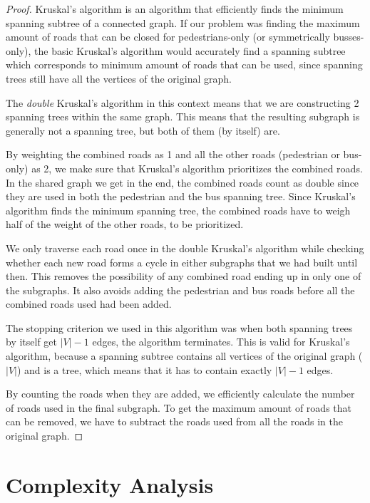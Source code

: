 \documentclass[a4paper]{article}
\begin{document}
\begin{proof}
    Kruskal's algorithm is an algorithm that efficiently finds the minimum spanning subtree of a connected graph. If our problem was finding the maximum amount of roads that can be closed for pedestrians-only (or symmetrically busses-only), the basic Kruskal's algorithm would accurately find a spanning subtree which corresponds to minimum amount of roads that can be used, since spanning trees still have all the vertices of the original graph.

    The \textsl{double} Kruskal's algorithm in this context means that we are constructing 2 spanning trees within the same graph. This means that the resulting subgraph is generally not a spanning tree, but both of them (by itself) are.

    By weighting the combined roads as 1 and all the other roads (pedestrian or bus-only) as 2, we make sure that Kruskal's algorithm prioritizes the combined roads. In the shared graph we get in the end, the combined roads count as double since they are used in both the pedestrian and the bus spanning tree. Since Kruskal's algorithm finds the minimum spanning tree, the combined roads have to weigh half of the weight of the other roads, to be prioritized.

    We only traverse each road once in the double Kruskal's algorithm while checking whether each new road forms a cycle in either subgraphs that we had built until then. This removes the possibility of any combined road ending up in only one of the subgraphs. It also avoids adding the pedestrian and bus roads before all the combined roads used had been added.

    The stopping criterion we used in this algorithm was when both spanning trees by itself get $|V| - 1$ edges, the algorithm terminates. This is valid for Kruskal's algorithm, because a spanning subtree contains all vertices of the original graph ($|V|$) and is a tree, which means that it has to contain exactly $|V| - 1$ edges.

    By counting the roads when they are added, we efficiently calculate the number of roads used in the final subgraph. To get the maximum amount of roads that can be removed, we have to subtract the roads used from all the roads in the original graph.


\end{proof}


\section{Complexity Analysis}
\end{document}
